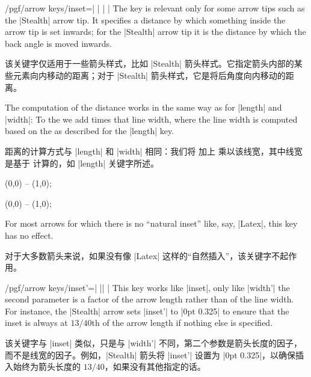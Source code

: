\begin{key}{/pgf/arrow keys/inset=| |%
        | |}
    The key is relevant only for some arrow tips such as the |Stealth| arrow
    tip. It specifies a distance by which something inside the arrow tip is set
    inwards; for the |Stealth| arrow tip it is the distance by which the back
    angle is moved inwards.

    该关键字仅适用于一些箭头样式，比如 |Stealth| 箭头样式。它指定箭头内部的某些元素向内移动的距离；对于 |Stealth| 箭头样式，它是将后角度向内移动的距离。

    The computation of the distance works in the same way as for |length| and
    |width|: To the  we add  times that
    line width, where the line width is computed based on the  as described for the |length| key.
    
    距离的计算方式与 |length| 和 |width| 相同：我们将  加上  乘以该线宽，其中线宽是基于  计算的，如 |length| 关键字所述。
\begin{codeexample}[preamble={\usetikzlibrary{arrows.meta}}]
\tikz \draw [arrows = {-Stealth[length=10pt, inset=5pt]}] (0,0) -- (1,0);
\end{codeexample}
\begin{codeexample}[preamble={\usetikzlibrary{arrows.meta}}]
\tikz \draw [arrows = {-Stealth[length=10pt, inset=2pt]}] (0,0) -- (1,0);
\end{codeexample}

    For most arrows for which there is no ``natural inset'' like, say, |Latex|,
    this key has no effect.

    对于大多数箭头来说，如果没有像 |Latex| 这样的“自然插入”，该关键字不起作用。
\end{key}

\begin{key}{/pgf/arrow keys/inset'=| || |}
    This key works like |inset|, only like |width'| the second parameter is a
    factor of the arrow length rather than of the line width. For instance, the
    |Stealth| arrow sets |inset'| to |0pt 0.325| to ensure that the inset is
    always at $13/40$th of the arrow length if nothing else is specified.

    该关键字与 |inset| 类似，只是与 |width'| 不同，第二个参数是箭头长度的因子，而不是线宽的因子。例如，|Stealth| 箭头将 |inset'| 设置为 |0pt 0.325|，以确保插入始终为箭头长度的 $13/40$，如果没有其他指定的话。
\end{key}

